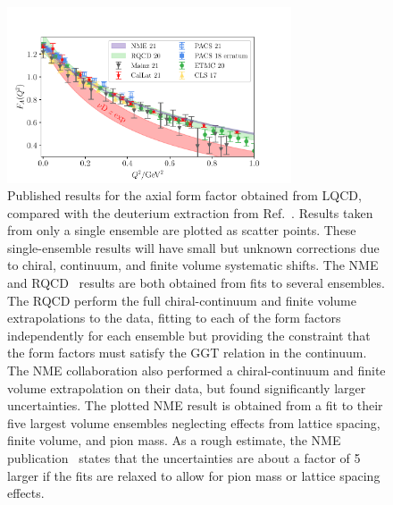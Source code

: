 \documentclass{ar-1col}
\begin{document}
\begin{figure}[hbt!]
\centering
\includegraphics[width=0.75\textwidth]{plots/gaq2-overlay-standalone.pdf}
\vspace{10pt}
\caption{
Published results for the axial form factor obtained from LQCD,
 compared with the deuterium extraction from Ref.~\cite{Meyer:2016oeg}.
Results taken from only a single ensemble are plotted as scatter points.
These single-ensemble results will have small but unknown corrections due to chiral, continuum,
 and finite volume systematic shifts.
The NME~\cite{Park:2021ypf} and RQCD~\cite{RQCD:2019jai}
 results are both obtained from fits to several ensembles.
The RQCD perform the full chiral-continuum and finite volume extrapolations to the data,
 fitting to each of the form factors independently for each ensemble but providing
 the constraint that the form factors must satisfy the GGT relation in the continuum.
The NME collaboration also performed a chiral-continuum and finite volume extrapolation
 on their data, but found significantly larger uncertainties.
The plotted NME result is obtained from a fit to their five largest volume ensembles neglecting
 effects from lattice spacing, finite volume, and pion mass.
As a rough estimate, the NME publication~\cite{Park:2021ypf} states that
 the uncertainties are about a factor of 5 larger if the fits are relaxed
 to allow for pion mass or lattice spacing effects.}
\label{fig:gaq2_overlay}
\end{figure}
\end{document}
